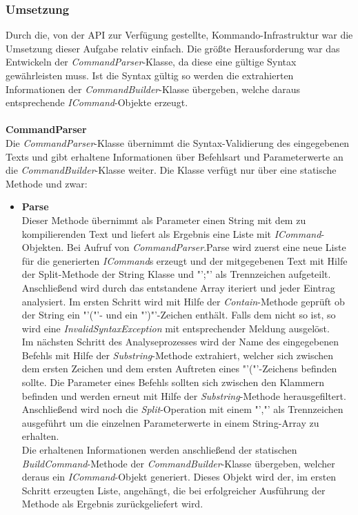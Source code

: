 \subsubsection{Umsetzung}
Durch die, von der API zur Verfügung gestellte, Kommando-Infrastruktur war die Umsetzung dieser Aufgabe relativ einfach. Die größte Herausforderung war das Entwickeln der \textit{CommandParser}-Klasse, da diese eine gültige Syntax gewährleisten muss. Ist die Syntax gültig so werden die extrahierten Informationen der \textit{CommandBuilder}-Klasse übergeben, welche daraus entsprechende \textit{ICommand}-Objekte erzeugt.\\
\\
\textbf{CommandParser}\\
Die \textit{CommandParser}-Klasse übernimmt die Syntax-Validierung des eingegebenen Texts und gibt erhaltene Informationen über Befehlsart und Parameterwerte an die \textit{CommandBuilder}-Klasse weiter. Die Klasse verfügt nur über eine statische Methode und zwar:
\begin{itemize}
\item \textbf{Parse}\\
Dieser Methode übernimmt als Parameter einen String mit dem zu kompilierenden Text und liefert als Ergebnis eine Liste mit \textit{ICommand}-Objekten. 
Bei Aufruf von \textit{CommandParser}.Parse wird zuerst eine neue Liste für die generierten \textit{ICommand}s erzeugt und der mitgegebenen Text mit Hilfe der Split-Methode der String Klasse und "';"' als Trennzeichen aufgeteilt. Anschließend wird durch das entstandene Array iteriert und jeder Eintrag analysiert. Im ersten Schritt wird mit Hilfe der \textit{Contain}-Methode geprüft ob der String ein "'("'- und ein "')"'-Zeichen enthält. Falls dem nicht so ist, so wird eine \textit{InvalidSyntaxException} mit entsprechender Meldung ausgelöst.\\
Im nächsten Schritt des Analyseprozesses wird der Name des eingegebenen Befehls mit Hilfe der \textit{Substring}-Methode extrahiert, welcher sich zwischen dem ersten Zeichen und dem ersten Auftreten eines "'("'-Zeichens befinden sollte. Die Parameter eines Befehls sollten sich zwischen den Klammern befinden und werden erneut mit Hilfe der \textit{Substring}-Methode herausgefiltert. Anschließend wird noch die \textit{Split}-Operation mit einem "',"' als Trennzeichen ausgeführt um die einzelnen Parameterwerte in einem String-Array zu erhalten.\\
Die erhaltenen Informationen werden anschließend der statischen \textit{BuildCommand}-Methode der \textit{CommandBuilder}-Klasse übergeben, welcher deraus ein \textit{ICommand}-Objekt generiert. Dieses Objekt wird der, im ersten Schritt erzeugten Liste, angehängt, die bei erfolgreicher Ausführung der Methode als Ergebnis zurückgeliefert wird.
\end{itemize}
